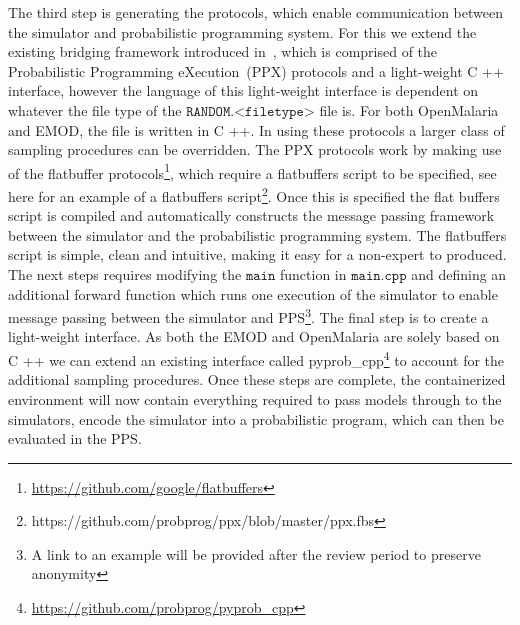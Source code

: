 \documentclass{article}
\begin{document}
The third step is generating the protocols, which enable communication between the simulator and probabilistic programming system. 
For this we extend the existing bridging framework introduced in~\cite{baydin2018efficient}, which is comprised of the Probabilistic Programming eXecution~(PPX) protocols and a light-weight C ++ interface, however the language of this light-weight interface is dependent on whatever the file type of the $\texttt{RANDOM.<filetype>}$ file is. 
For both OpenMalaria and EMOD, the file is written in C ++.
In using these protocols a larger class of sampling procedures can be overridden. The PPX protocols work by making use of the flatbuffer protocols\footnote{\url{https://github.com/google/flatbuffers}}, which require a flatbuffers script to be specified, see here for an example of a flatbuffers script\footnote{https://github.com/probprog/ppx/blob/master/ppx.fbs}. Once this is specified the flat buffers script is compiled and automatically constructs the message passing framework between the simulator and the probabilistic programming system. The flatbuffers script is simple, clean and intuitive, making it easy for a non-expert to produced.
The next steps requires modifying the $\texttt{main}$ function in $\texttt{main.cpp}$ and defining an additional forward function which runs one execution of the simulator to enable message passing between the simulator and PPS\footnote{A link to an example will be provided after the review period to preserve anonymity}.
The final step is to create a light-weight interface. As both the EMOD and OpenMalaria are solely based on C ++ we can extend an existing interface called pyprob\_cpp\footnote{\url{https://github.com/probprog/pyprob_cpp}} to account for the additional sampling procedures.
Once these steps are complete, the containerized environment will now contain everything required to pass models through to the simulators, encode the simulator into a probabilistic program, which can then be evaluated in the PPS.
\end{document}
